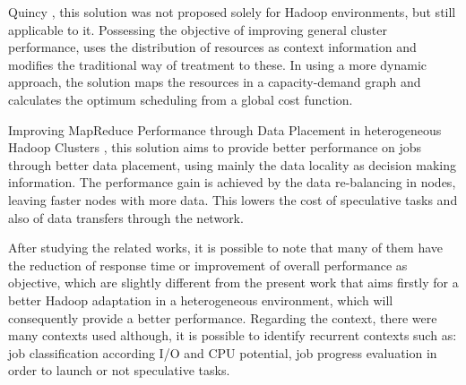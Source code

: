 Quincy \cite{Quincy}, this solution was not proposed solely for Hadoop environments, but still applicable to it. Possessing the objective of improving general cluster performance, uses the distribution of resources as context information and modifies the traditional way of treatment to these. In using a more dynamic approach, the solution maps the resources in a capacity-demand graph and calculates the optimum scheduling from a global cost function.

Improving MapReduce Performance through Data Placement in heterogeneous Hadoop Clusters \cite{IMRPDPHHC}, this 	solution aims to provide better performance on jobs through better data placement, using mainly the data locality as decision making information. The performance gain is achieved by the data re-balancing in nodes, leaving faster nodes with more data. This lowers the cost of speculative tasks and also of data transfers through the network.

After studying the related works, it is possible to note that many of them have the reduction of response time or improvement of overall performance as objective, which are slightly different from the present work that aims firstly for a better Hadoop adaptation in a heterogeneous environment, which will consequently provide a better performance.
Regarding the context, there were many contexts used although, it is possible to identify recurrent contexts such as: job classification according I/O and CPU potential, job progress evaluation in order to launch or not speculative tasks.